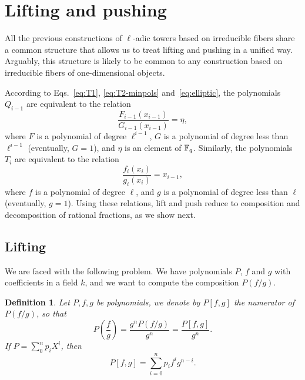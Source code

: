 \documentclass{sig-alternate}
\newtheorem{definition}{Definition}
\begin{document}

\section{Lifting and pushing}
\label{sec:lift-push}

All the previous constructions of $\ell$-adic towers based on
irreducible fibers share a common structure that allows us to treat
lifting and pushing in a unified way. Arguably, this structure is
likely to be common to any construction based on irreducible fibers of
one-dimensional objects.

According to Eqs.~\eqref{eq:T1}, \eqref{eq:T2-minpols}
and~\eqref{eq:elliptic}, the polynomials $Q_{i-1}$ are equivalent to
the relation
\begin{equation}
  \label{eq:level-i}
  \frac{F_{i-1}(x_{i-1})}{G_{i-1}(x_{i-1})} = \eta,
\end{equation}
where $F$ is a polynomial of degree $\ell^{i-1}$, $G$ is a polynomial
of degree less than $\ell^{i-1}$ (eventually, $G=1$), and $\eta$ is an
element of $\mathbb{F}_q$. Similarly, the polynomials $T_i$ are equivalent to
the relation
\begin{equation}
  \label{eq:level-i+1}
  \frac{f_i(x_i)}{g_i(x_i)} = x_{i-1},
\end{equation}
where $f$ is a polynomial of degree $\ell$, and $g$ is a polynomial of
degree less than $\ell$ (eventually, $g=1$).  Using these relations,
lift and push reduce to composition and decomposition of rational
fractions, as we show next.

\subsection{Lifting}
We are faced with the following problem. We have polynomials $P$, $f$
and $g$ with coefficients in a field $k$, and we want to compute the
composition $P(f/g)$.

\begin{definition}
  Let $P,f,g$ be polynomials, we denote by $P[f,g]$ the numerator of
  $P(f/g)$, so that
  \begin{equation}
    P\left(\frac{f}{g}\right) = \frac{g^nP(f/g)}{g^n} = \frac{P[f,g]}{g^n}.
  \end{equation}
  If $P=\sum_0^np_iX^i$, then
  \begin{equation}
    P[f,g] = \sum_{i=0}^n  p_if^ig^{n-i}.
  \end{equation}
\end{definition}
\end{document}
